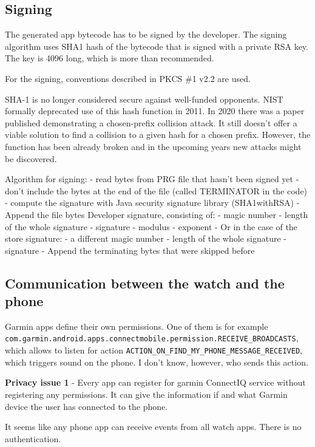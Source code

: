 \subsection{Signing} \label{subsec:signing}
The generated app bytecode has to be signed by the developer.
The signing algorithm uses SHA1 hash of the bytecode that is signed with a private RSA key.
The key is 4096 long, which is more than recommended.

For the signing, conventions described in PKCS \#1 v2.2 are used.

SHA-1 is no longer considered secure against well-funded opponents.
NIST formally deprecated use of this hash function in 2011.
In 2020 there was a paper published demonstrating a chosen-prefix collision attack.
It still doesn't offer a viable solution to find a collision to a given hash for a chosen prefix.
However, the function has been already broken and in the upcoming years new attacks might be discovered.

Algorithm for signing:
- read bytes from PRG file that hasn't been signed yet
- don't include the bytes at the end of the file (called TERMINATOR in the code)
- compute the signature with Java security signature library (SHA1withRSA)
- Append the file bytes Developer signature, consisting of:
- magic number
- length of the whole signature
- signature
- modulus
- exponent
- Or in the case of the store signature:
- a different magic number
- length of the whole signature
- signature
- Append the terminating bytes that were skipped before

\subsection{Communication between the watch and the phone} \label{subsec:communication-watch-phone}

Garmin apps define their own permissions.
One of them is for example \verb|com.garmin.android.apps.connectmobile.permission.RECEIVE_BROADCASTS|, which allows to listen for action \verb|ACTION_ON_FIND_MY_PHONE_MESSAGE_RECEIVED|, which triggers sound on the phone.
I don't know, however, who sends this action.

\textbf{Privacy issue 1} - Every app can register for garmin ConnectIQ service without registering any permissions.
It can give the information if and what Garmin device the user has connected to the phone.

It seems like any phone app can receive events from all watch apps.
There is no authentication.

